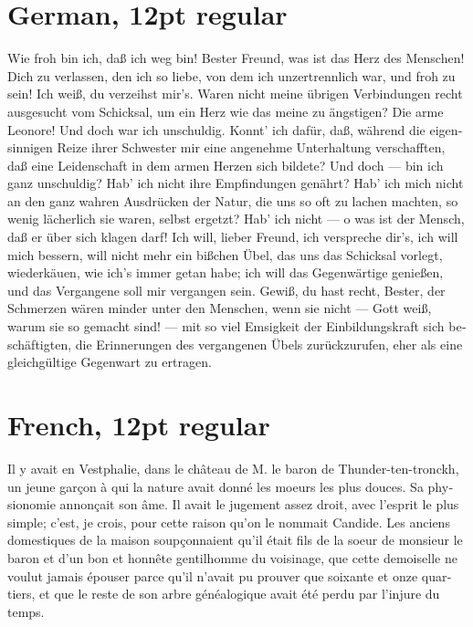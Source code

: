 \documentclass[12pt]{book}
\newcommand{\germanfont}{\stdfont}
\newcommand{\germ}[1]{\textgerman{\germanfont#1}}
\begin{document}
\section*{German, 12pt regular}

\germ{Wie froh bin ich, daß ich weg bin! Bester Freund, was ist das Herz des 
Menschen! Dich zu verlassen, den ich so liebe, von dem ich unzertrennlich war, 
und froh zu sein!  Ich weiß, du verzeihst mir’s. Waren nicht meine übrigen 
Verbindungen recht ausgesucht vom Schicksal, um ein Herz wie das meine zu 
ängstigen? Die arme Leonore!  Und doch war ich unschuldig. Konnt’ ich dafür, 
daß, während die eigensinnigen Reize ihrer Schwester mir eine angenehme 
Unterhaltung verschafften, daß eine Leidenschaft in dem armen Herzen sich 
bildete? Und doch — bin ich ganz unschuldig? Hab’ ich nicht ihre Empfindungen 
genährt? Hab’ ich mich nicht an den ganz wahren Ausdrücken der Natur, die uns 
so oft zu lachen machten, so wenig lächerlich sie waren, selbst ergetzt?  
Hab’ ich nicht — o was ist der Mensch, daß er über sich klagen darf! Ich will, 
lieber Freund, ich verspreche dir’s, ich will mich bessern, will nicht mehr 
ein bißchen Übel, das uns das Schicksal vorlegt, wiederkäuen, wie ich’s immer 
getan habe; ich will das Gegenwärtige genießen, und das Vergangene soll mir 
vergangen sein. Gewiß, du hast recht, Bester, der Schmerzen wären minder unter 
den Menschen, wenn sie nicht — Gott weiß, warum sie so gemacht sind! — mit so 
viel Emsigkeit der Einbildungskraft sich beschäftigten, die Erinnerungen des 
vergangenen Übels zurückzurufen, eher als eine gleichgültige Gegenwart zu 
ertragen.}

\section*{French, 12pt regular}

\textfrench{Il y avait en Vestphalie, dans le château de M. le baron de
Thunder-ten-tronckh, un jeune garçon à qui la nature avait donné les
moeurs les plus douces. Sa physionomie annonçait son âme. Il avait le
jugement assez droit, avec l’esprit le plus simple; c’est, je crois,
pour cette raison qu’on le nommait Candide. Les anciens domestiques de
la maison soupçonnaient qu’il était fils de la soeur de monsieur le
baron et d’un bon et honnête gentilhomme du voisinage, que cette
demoiselle ne voulut jamais épouser parce qu’il n’avait pu prouver que
soixante et onze quartiers, et que le reste de son arbre généalogique
avait été perdu par l’injure du temps.}
\end{document}
